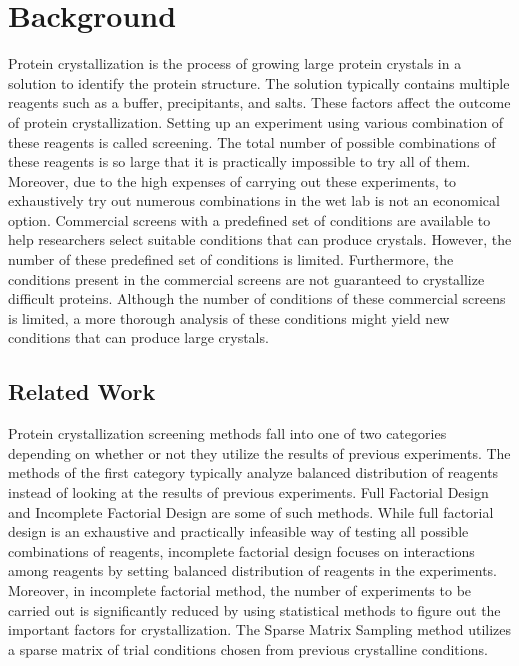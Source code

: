 \chapter{Background}
\label{ch:background}

Protein crystallization is the process of growing large protein crystals in a solution to identify the protein structure. The solution typically contains multiple reagents such as a buffer, precipitants, and salts. These factors affect the outcome of protein crystallization. Setting up an experiment using various combination of these reagents is called screening. The total number of possible combinations of these reagents is so large that it is practically impossible to try all of them. Moreover, due to the high expenses of carrying out these experiments, to exhaustively try out numerous combinations in the wet lab is not an economical option. Commercial screens with a predefined set of conditions are available to help researchers select suitable conditions that can produce crystals. However, the number of these predefined set of conditions is limited. Furthermore, the conditions present in the commercial screens are not guaranteed to crystallize difficult proteins\cite{SamyamThesis}. Although the number of conditions of these commercial screens is limited, a more thorough analysis of these conditions might yield new conditions that can produce large crystals.

\section{Related Work} \label{sec:bg-related}

Protein crystallization screening methods fall into one of two categories depending on whether or not they utilize the results of previous experiments\cite{Montgomery}. The methods of the first category typically analyze balanced distribution of reagents instead of looking at the results of previous experiments. Full Factorial Design and Incomplete Factorial Design are some of such methods. While full factorial design is an exhaustive and practically infeasible way of testing all possible combinations of reagents, incomplete factorial design \cite{carter1979protein} focuses on interactions among reagents by setting balanced distribution of reagents in the experiments.  Moreover, in incomplete factorial method, the number of experiments to be carried out is significantly reduced by using statistical methods to figure out the important factors for crystallization. The Sparse Matrix Sampling \cite{jancarik1991sparse} method utilizes a sparse matrix of trial conditions chosen from previous crystalline conditions.

